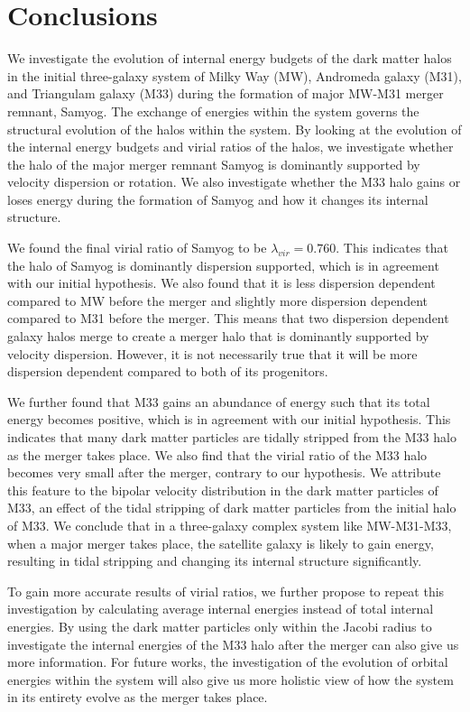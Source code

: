 \documentclass[twocolumn]{aastex631}
\begin{document}
\section{Conclusions}
\label{sec:concl}
We investigate the evolution of internal energy budgets of the dark matter halos in the initial three-galaxy system of Milky Way (MW), Andromeda galaxy (M31), and Triangulam galaxy (M33) during the formation of major MW-M31 merger remnant, Samyog. The exchange of energies within the system governs the structural evolution of the halos within the system. By looking at the evolution of the internal energy budgets and virial ratios of the halos, we investigate whether the halo of the major merger remnant Samyog is dominantly supported by velocity dispersion or rotation. We also investigate whether the M33 halo gains or loses energy during the formation of Samyog and how it changes its internal structure.

We found the final virial ratio of Samyog to be $\lambda_{vir} = 0.760$. This indicates that the halo of Samyog is dominantly dispersion supported, which is in agreement with our initial hypothesis. We also found that it is less dispersion dependent compared to MW before the merger and slightly more dispersion dependent compared to M31 before the merger. This means that two dispersion dependent galaxy halos merge to create a merger halo that is dominantly supported by velocity dispersion. However, it is not necessarily true that it will be more dispersion dependent compared to both of its progenitors.

We further found that M33 gains an abundance of energy such that its total energy becomes positive, which is in agreement with our initial hypothesis. This indicates that many dark matter particles are tidally stripped from the M33 halo as the merger takes place. We also find that the virial ratio of the M33 halo becomes very small after the merger, contrary to our hypothesis. We attribute this feature to the bipolar velocity distribution in the dark matter particles of M33, an effect of the tidal stripping of dark matter particles from the initial halo of M33. We conclude that in a three-galaxy complex system like MW-M31-M33, when a major merger takes place, the satellite galaxy is likely to gain energy, resulting in tidal stripping and changing its internal structure significantly.

To gain more accurate results of virial ratios, we further propose to repeat this investigation by calculating average internal energies instead of total internal energies. By using the dark matter particles only within the Jacobi radius to investigate the internal energies of the M33 halo after the merger can also give us more information. For future works, the investigation of the evolution of orbital energies within the system will also give us more holistic view of how the system in its entirety evolve as the merger takes place.
\end{document}
